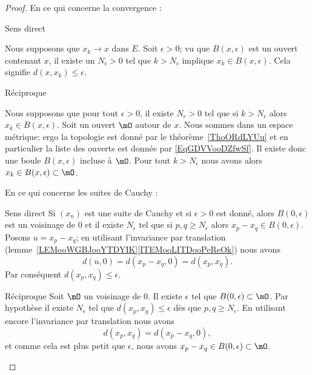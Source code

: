 \begin{proof}
   En ce qui concerne la convergence :
    \begin{subproof}
        \item[Sens direct]

            Nous supposons que \( x_k\to x\) dans \( E\). Soit \( \epsilon>0\); vu que \( B(x,\epsilon)\) est un ouvert contenant \( x\), il existe un \( N_{\epsilon}>0 \) tel que \( k>N_{\epsilon}\) implique \( x_k\in B(x,\epsilon)\). Cela signifie \( d(x,x_k)\leq \epsilon\).

        \item[Réciproque]

            Nous supposons que pour tout \( \epsilon>0\), il existe \( N_{\epsilon}>0\) tel que si \( k>N_{\epsilon}\) alors \( x_k\in B(x,\epsilon)\). Soit un ouvert \( \mO\) autour de \( x\). Nous sommes dans un espace métrique; ergo la topologie est donné par le théorème~\ref{ThoORdLYUu} et en particulier la liste des ouverts est donnée par \eqref{EqGDVVooDZfwSf}. Il existe donc une boule \( B(x,\epsilon)\) incluse à \( \mO\). Pour tout \( k>N_{\epsilon}\) nous avons alors \( x_k\in B(x,\epsilon)\subset\mO\).
    \end{subproof}
    En ce qui concerne les suites de Cauchy :
    \begin{subproof}
    \item[Sens direct]
        Si \( (x_n)\) est une suite de Cauchy et si \( \epsilon>0\) est donné, alors \( B(0,\epsilon)\) est un voisinage de \( 0\) et il existe \( N_{\epsilon}\) tel que si \( p,q\geq N_{\epsilon}\) alors \( x_p-x_q\in B(0,\epsilon)\). Posons \( u=x_p-x_q\); en utilisant l'invariance par translation (lemme~\ref{LEMooWGBJooYTDYIK}\ref{ITEMooLITDooPeReOk}) nous avons
        \begin{equation}
            d(u,0)=d(x_p-x_q,0)=d(x_p,x_q).
        \end{equation}
        Par conséquent \( d(x_p,x_q)\leq \epsilon\).
    \item[Réciproque]
        Soit \( \mO\) un voisinage de \( 0\). Il existe \( \epsilon\) tel que \( B(0,\epsilon)\subset \mO\). Par hypothèse il existe \( N_{\epsilon}\) tel que \( d(x_p,x_q)\leq \epsilon\) dès que \( p,q\geq N_{\epsilon}\). En utilisant encore l'invariance par translation nous avons
        \begin{equation}
            d(x_p,x_q)=d(x_p-x_q,0),
        \end{equation}
        et comme cela est plus petit que \( \epsilon\), nous avons \( x_p-x_q\in B(0,\epsilon)\subset\mO\).
    \end{subproof}
\end{proof}

